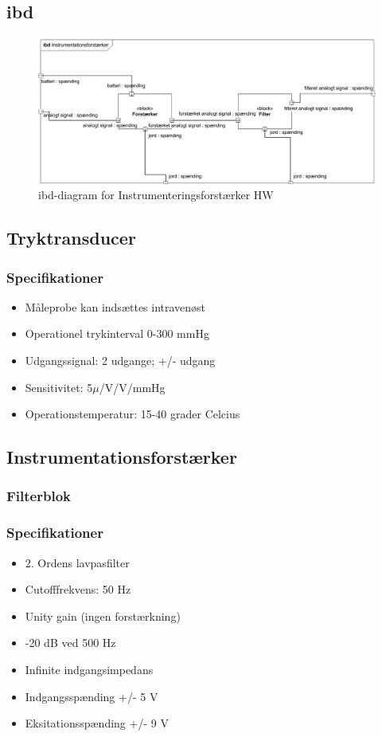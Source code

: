 \subsection{ibd}

\begin{figure}[H]
	\centering
	\includegraphics[width=1\textwidth]{Figurer/Snip20151104_48}
	\caption{ibd-diagram for Instrumenteringsforstærker HW}
	\label{fig:ibdhw-diagram}
\end{figure}

\subsection{Tryktransducer}
\subsubsection{Specifikationer}
\begin{itemize}
	\item Måleprobe kan indsættes intravenøst
	\item Operationel trykinterval 0-300 mmHg
	\item Udgangssignal: 2 udgange; +/- udgang
	\item Sensitivitet: 5$\mu$/V/V/mmHg 
	\item Operationstemperatur: 15-40 grader Celcius
\end{itemize}

 \subsection{Instrumentationsforstærker}
 
 
 \subsubsection{Filterblok}
 \subsubsection{Specifikationer}
 \begin{itemize}
 	\item 2. Ordens lavpasfilter
 	\item Cutofffrekvens: 50 Hz
 	\item Unity gain (ingen forstærkning)
 	\item -20 dB ved 500 Hz
 	\item Infinite indgangsimpedans
 	\item Indgangsspænding +/- 5 V
 	\item Eksitationsspænding +/- 9 V
 \end{itemize}
 
